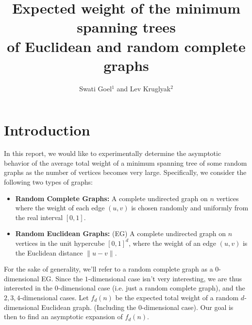 \documentclass[a4paper, 10pt, twocolumn, twoside]{article}
\begin{document}
\linespread{0.5}

\title{Expected weight of the minimum spanning trees\\ of Euclidean and random complete graphs}

\author{Swati Goel$^{1}$ and Lev Kruglyak$^2$}



\maketitle 
\thispagestyle{fancy} 
\pagestyle{fancy}

\section{Introduction}
\label{sec:Introduction}

In this report, we would like to experimentally determine the asymptotic behavior of the average total weight of a minimum spanning tree of some random graphs as the number of vertices becomes very large. Specifically, we consider the following two types of graphs:
\begin{itemize}
    \item \textbf{Random Complete Graphs:} A complete undirected graph on $n$ vertices where the weight of each edge $(u,v)$ is chosen randomly and uniformly from the real interval $[0,1]$.
    \item \textbf{Random Euclidean Graphs:} (EG) A complete undirected graph on $n$ vertices in the unit hypercube $[0,1]^d$, where the weight of an edge $(u,v)$ is the Euclidean distance $\|u-v\|$. 
\end{itemize}

For the sake of generality, we'll refer to a random complete graph as a $0$-dimensional EG. Since the $1$-dimensional case isn't very interesting, we are thus interested in the $0$-dimensional case (i.e. just a random complete graph), and the $2,3,4$-dimensional cases. Let $f_d(n)$ be the expected total weight of a random $d$-dimensional Euclidean graph. (Including the $0$-dimensional case). Our goal is then to find an asymptotic expansion of $f_d(n)$.
\end{document}
